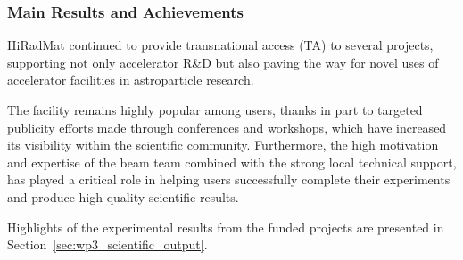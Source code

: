 
\subsubsection*{Main Results and Achievements}

HiRadMat continued to provide transnational access (TA) to several projects, supporting not only accelerator R\&D but also paving the way for novel uses of accelerator facilities in astroparticle research. 

The facility remains highly popular among users, thanks in part to targeted publicity efforts made through conferences and workshops, which have increased its visibility within the scientific community. Furthermore, the high motivation and expertise of the beam team combined with the strong local technical support, has played a critical role in helping users successfully complete their experiments and produce high-quality scientific results.

Highlights of the experimental results from the funded projects are presented in Section~\ref{sec:wp3_scientific_output}.

